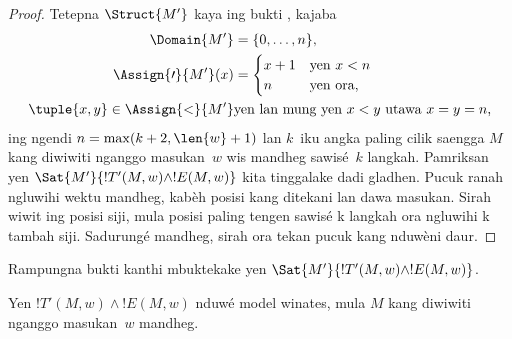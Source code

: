 \documentclass[../../../include/open-logic-section]{subfiles}
\begin{document}
\begin{proof}
  Tetepna $\Struct{M'}$ kaya ing bukti
  , kajaba
  \begin{align*}
    \Domain{M'} & = \{0, \dots, n\},\\
    \Assign{\prime}{M'}(x) & = 
    \begin{cases}
      x + 1 &\text{yen $x < n$}\\
      n &\text{yen ora,}
    \end{cases} \\
    \tuple{x,y} \in \Assign{<}{M'} &\text{yen lan mung yen $x < y$ utawa $x = y = n$,}
  \end{align*}
  ing ngendi $n = \max(k+2,\len{w}+1)$ lan $k$~iku
  angka paling cilik saengga $M$ kang diwiwiti
  nganggo masukan~$w$ wis mandheg sawisé~$k$
  langkah. Pamriksan yen
  $\Sat{M'}{!T'(M,w) \land !E(M,w)}$
  kita tinggalake dadi gladhen. Pucuk ranah ngluwihi wektu mandheg, kabèh posisi kang ditekani lan dawa masukan. Sirah wiwit ing posisi siji, mula posisi paling tengen sawisé k langkah ora ngluwihi k tambah siji. Sadurungé mandheg, sirah ora tekan pucuk kang nduwèni daur.
\end{proof}

\begin{prob}
  Rampungna bukti 
  kanthi mbuktekake yen
  $\Sat{M'}{!T'(M,w) \land !E(M,w)}$.
\end{prob}

\begin{lem}
  Yen $!T'(M,w) \land !E(M,w)$ nduwé model winates,
  mula $M$ kang diwiwiti nganggo masukan~$w$ mandheg.
\end{lem}
\end{document}
